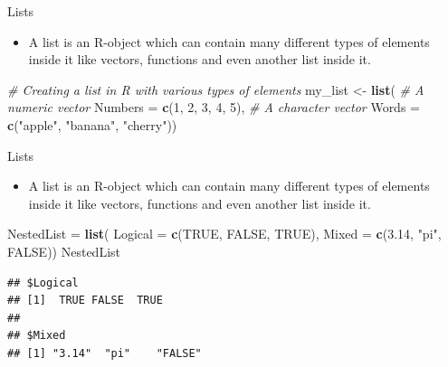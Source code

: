 \documentclass[
  ignorenonframetext,
]{beamer}
\newenvironment{Shaded}{\begin{snugshade}}{\end{snugshade}}
\newcommand{\AttributeTok}[1]{\textcolor[rgb]{0.13,0.29,0.53}{#1}}
\newcommand{\CommentTok}[1]{\textcolor[rgb]{0.56,0.35,0.01}{\textit{#1}}}
\newcommand{\ConstantTok}[1]{\textcolor[rgb]{0.56,0.35,0.01}{#1}}
\newcommand{\DecValTok}[1]{\textcolor[rgb]{0.00,0.00,0.81}{#1}}
\newcommand{\FloatTok}[1]{\textcolor[rgb]{0.00,0.00,0.81}{#1}}
\newcommand{\FunctionTok}[1]{\textcolor[rgb]{0.13,0.29,0.53}{\textbf{#1}}}
\newcommand{\NormalTok}[1]{#1}
\newcommand{\OtherTok}[1]{\textcolor[rgb]{0.56,0.35,0.01}{#1}}
\newcommand{\StringTok}[1]{\textcolor[rgb]{0.31,0.60,0.02}{#1}}
\providecommand{\tightlist}{%
  \setlength{\itemsep}{0pt}\setlength{\parskip}{0pt}}
\begin{document}
\begin{frame}[fragile]{Lists}
\label{lists}
\begin{itemize}
\tightlist
\item
  A list is an R-object which can contain many different types of
  elements inside it like vectors, functions and even another list
  inside it.
\end{itemize}

\begin{Shaded}
\begin{Highlighting}[]
\CommentTok{\# Creating a list in R with various types of elements}
\NormalTok{my\_list }\OtherTok{\textless{}{-}} \FunctionTok{list}\NormalTok{(}
  \CommentTok{\# A numeric vector}
  \AttributeTok{Numbers =} \FunctionTok{c}\NormalTok{(}\DecValTok{1}\NormalTok{, }\DecValTok{2}\NormalTok{, }\DecValTok{3}\NormalTok{, }\DecValTok{4}\NormalTok{, }\DecValTok{5}\NormalTok{),}
  \CommentTok{\# A character vector}
  \AttributeTok{Words =} \FunctionTok{c}\NormalTok{(}\StringTok{"apple"}\NormalTok{, }\StringTok{"banana"}\NormalTok{, }\StringTok{"cherry"}\NormalTok{))}
\end{Highlighting}
\end{Shaded}
\end{frame}

\begin{frame}[fragile]{Lists}
\label{lists-1}
\begin{itemize}
\tightlist
\item
  A list is an R-object which can contain many different types of
  elements inside it like vectors, functions and even another list
  inside it.
\end{itemize}

\begin{Shaded}
\begin{Highlighting}[]
\NormalTok{  NestedList }\OtherTok{=} \FunctionTok{list}\NormalTok{(}
    \AttributeTok{Logical =} \FunctionTok{c}\NormalTok{(}\ConstantTok{TRUE}\NormalTok{, }\ConstantTok{FALSE}\NormalTok{, }\ConstantTok{TRUE}\NormalTok{),}
    \AttributeTok{Mixed =} \FunctionTok{c}\NormalTok{(}\FloatTok{3.14}\NormalTok{, }\StringTok{"pi"}\NormalTok{, }\ConstantTok{FALSE}\NormalTok{))}
\NormalTok{NestedList}
\end{Highlighting}
\end{Shaded}

\begin{verbatim}
## $Logical
## [1]  TRUE FALSE  TRUE
## 
## $Mixed
## [1] "3.14"  "pi"    "FALSE"
\end{verbatim}
\end{frame}
\end{document}
